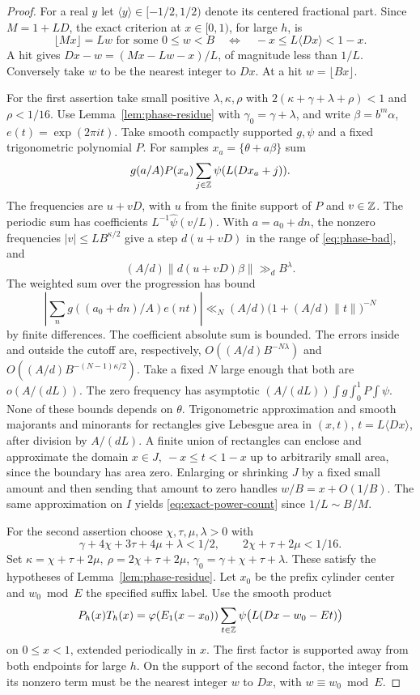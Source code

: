 \begin{proof}
For a real \(y\) let \(\langle y\rangle\in[-1/2,1/2)\) denote its
centered fractional part. Since \(M=1+LD\), the exact criterion
at \(x\in[0,1)\), for large \(h\), is
\begin{equation}\label{eq:target-centred}
 \lfloor Mx\rfloor=Lw\text{ for some }0\le w<B
 \quad\Longleftrightarrow\quad -x\le L\langle Dx\rangle<1-x.
\end{equation}
A hit gives \(Dx-w=(Mx-Lw-x)/L\), of magnitude less than \(1/L\).
Conversely take \(w\) to be the nearest integer to \(Dx\).
At a hit \(w=\lfloor Bx\rfloor\).

For the first assertion take small positive \(\lambda,\kappa,\rho\)
with \(2(\kappa+\gamma+\lambda+\rho)<1\) and \(\rho<1/16\).
Use Lemma~\ref{lem:phase-residue} with \(\gamma_0=\gamma+\lambda\),
and write \(\beta=b^m\alpha\), \(e(t)=\exp(2\pi i t)\).
Take smooth compactly supported \(g,\psi\) and a fixed
trigonometric polynomial \(P\). For samples \(x_a=\{\theta+a\beta\}\)
sum
\[
 g(a/A)P(x_a)\sum_{j\in\mathbb Z}\psi(L(Dx_a+j)).
\]
The frequencies are \(u+vD\), with \(u\) from the finite support
of \(P\) and \(v\in\mathbb Z\). The periodic sum has coefficients
\(L^{-1}\widehat\psi(v/L)\). With \(a=a_0+dn\), the nonzero
frequencies \(|v|\le L B^{\kappa/2}\) give a step
\(d(u+vD)\) in the range of \eqref{eq:phase-bad}, and
\[
 (A/d)\|d(u+vD)\beta\|\gg_d B^\lambda.
\]
The weighted sum over the progression has bound
\[
 \left|\sum_n g((a_0+dn)/A)e(nt)\right|
 \ll_N (A/d)\bigl(1+(A/d)\|t\|\bigr)^{-N}
\]
by finite differences. The coefficient absolute sum is bounded.
The errors inside and outside the cutoff are, respectively,
\(O((A/d)B^{-N\lambda})\) and
\(O((A/d)B^{-(N-1)\kappa/2})\). Take a fixed \(N\) large enough
that both are \(o(A/(dL))\). The zero frequency has asymptotic
\((A/(dL))\int g\int_0^1P\int\psi\). None of these bounds depends
on \(\theta\). Trigonometric approximation and smooth
majorants and minorants for rectangles give Lebesgue area in
\((x,t)\), \(t=L\langle Dx\rangle\), after division by \(A/(dL)\).
A finite union of rectangles can enclose and approximate the domain
\(x\in J,\ -x\le t<1-x\) up to arbitrarily small area, since the
boundary has area zero. Enlarging or shrinking \(J\) by a fixed small
amount and then sending that amount to zero handles \(w/B=x+O(1/B)\).
The same approximation on \(I\) yields \eqref{eq:exact-power-count}
since \(1/L\sim B/M\).

For the second assertion choose \(\chi,\tau,\mu,\lambda>0\) with
\[
 \gamma+4\chi+3\tau+4\mu+\lambda<1/2,\qquad
 2\chi+\tau+2\mu<1/16 .
\]
Set \(\kappa=\chi+\tau+2\mu,\ \rho=2\chi+\tau+2\mu\),
\(\gamma_0=\gamma+\chi+\tau+\lambda\). These satisfy the hypotheses
of Lemma~\ref{lem:phase-residue}. Let \(x_0\) be the prefix cylinder
center and \(w_0\bmod E\) the specified suffix label. Use the smooth
product
\[
  P_h(x)T_h(x)=\varphi(E_1(x-x_0))
      \sum_{t\in\mathbb Z}\psi\bigl(L(Dx-w_0-Et)\bigr)
\]
on \(0\le x<1\), extended periodically in \(x\). The first factor
is supported away from both endpoints for large \(h\). On the
support of the second factor, the integer from its nonzero term
must be the nearest integer \(w\) to \(Dx\), with \(w\equiv w_0\bmod E\).


\end{proof}
